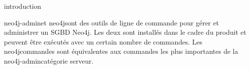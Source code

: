 \begin{frame}{introduction}
     
   neo4j-adminet neo4jsont des outils de ligne de commande pour gérer et administrer un SGBD Neo4j. Les deux sont installés dans le cadre du produit et peuvent être exécutés avec un certain nombre de commandes. Les neo4jcommandes sont équivalentes aux commandes les plus importantes de la neo4j-admincatégorie serveur.
  
\end{frame}